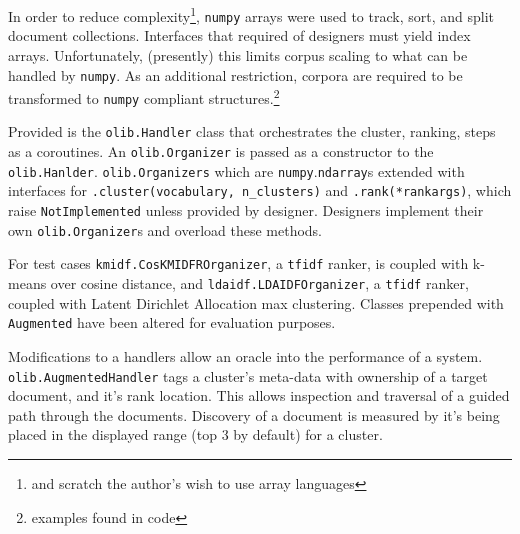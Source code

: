 \documentclass[11pt]{article}
\def\tfidf{\texttt{tfidf}\xspace}
\def\np{\texttt{numpy}\xspace}
\begin{document}
In order to reduce complexity\footnote{and scratch the author's wish to use array languages},
\np arrays were used to track, sort, and split document collections. Interfaces that
required of designers must yield index arrays. Unfortunately, (presently) this limits
corpus scaling to what can be handled by \np. As an additional restriction, corpora are
required to be transformed to \np compliant structures.\footnote{examples found in code}

Provided is the \texttt{olib.Handler} class that orchestrates the cluster, ranking,
steps as a coroutines. An \texttt{olib.Organizer} is passed as a constructor to the
\texttt{olib.Hanlder}.
\texttt{olib.Organizers} which are \np.\texttt{ndarray}s extended with interfaces for
\texttt{.cluster(vocabulary, n\_clusters)} and \texttt{.rank(*rankargs)}, which raise
\texttt{NotImplemented} unless provided by designer. Designers implement their own
\texttt{olib.Organizer}s and overload these methods.

For test cases \texttt{kmidf.CosKMIDFROrganizer}, a \tfidf
ranker, is coupled with k-means over cosine distance, and \texttt{ldaidf.LDAIDFOrganizer},
 a \tfidf ranker, coupled with Latent Dirichlet Allocation max clustering.
Classes prepended with \texttt{Augmented} have been altered for evaluation purposes.

Modifications to a handlers allow an oracle into the performance of a system.
\texttt{olib.AugmentedHandler} tags a cluster's meta-data with ownership of a target
document, and it's rank location. This allows inspection and traversal of a guided path
through the documents. Discovery of a document is measured by
it's being placed in the displayed range (top 3 by default) for a cluster.

\end{document}
